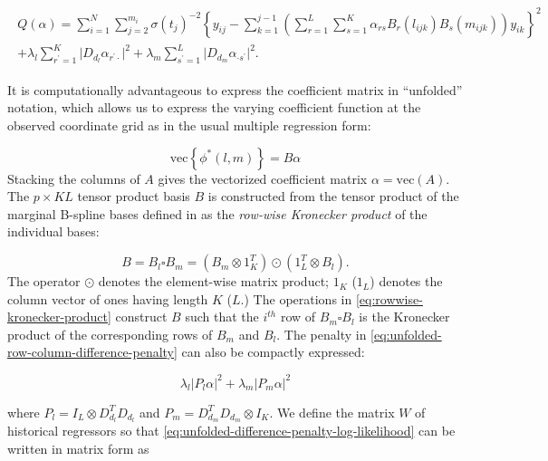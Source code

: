 \documentclass[12pt]{article}
\newcommand{\ms}{\scriptscriptstyle}
\theoremstyle{definition}
\begin{document}
\begin{align} 
\begin{split}\label{eq:unfolded-difference-penalty-log-likelihood}
Q\left( \alpha \right) = \sum_{i=1}^N \sum_{j=2}^{m_i} \sigma\left({t_j}\right)^{-2} \left\{y_{ij} - \sum_{k=1}^{j-1} \left( \sum_{r=1}^L \sum_{s=1}^K \alpha_{rs} B_r\left(l_{ijk}\right)B_s\left(m_{ijk}\right)\right)y_{ik} \right\}^2 \\ 
+ \lambda_l \sum_{r^\prime=1}^K \vert D_{d_{\ms l}} \alpha_{r^\prime \cdot} \vert^2 + \lambda_m \sum_{s^\prime=1}^L \vert D_{d_{\ms m}} \alpha_{\cdot s^\prime} \vert^2.
\end{split}
\end{align}

It is computationally advantageous to express the coefficient matrix in ``unfolded'' notation, which allows us to express the varying coefficient function at the observed coordinate grid as in the usual multiple regression form:

\begin{equation*}
\mbox{vec}\left\{\phi^*\left(l,m\right)\right\} = B \alpha
\end{equation*}
\noindent
Stacking the columns of $A$ gives the vectorized coefficient matrix $\alpha = \mbox{vec}\left( A \right)$. The $p \times KL$ tensor product basis $B$ is constructed from the tensor product of the marginal B-spline bases defined in \citet{eilers2006fast} as the \textit{row-wise Kronecker product} of the individual bases:

\begin{equation} \label{eq:rowwise-kronecker-product}
B = B_l \square B_m = \left( B_m \otimes 1^T_{K} \right) \odot \left(1^T_{L} \otimes  B_l  \right).
\end{equation}
\noindent
The operator $\odot$ denotes the element-wise matrix product; $1_K$ ($1_L$) denotes the column vector of ones having length $K$ ($L$.) The operations in \ref{eq:rowwise-kronecker-product} construct $B$ such that the $i^{th}$ row of $B_m\square B_l$ is the Kronecker product of the corresponding rows of $B_m$ and $B_l$. The penalty in \ref{eq:unfolded-row-column-difference-penalty} can also be compactly expressed:

\begin{equation} \label{eq:tensor-product-penalty}
\lambda_l \vert P_l \alpha \vert^2 + \lambda_m \vert P_m \alpha \vert^2
\end{equation}

where $P_l = I_L \otimes D_{d_{\ms l}}^T D_{d_{\ms l}} $ and $P_m =  D_{d_{\ms m}}^T D_{d_{\ms m}} \otimes I_K$. We define the matrix $W$ of historical regressors so that \ref{eq:unfolded-difference-penalty-log-likelihood} can be written in matrix form as
\end{document}
